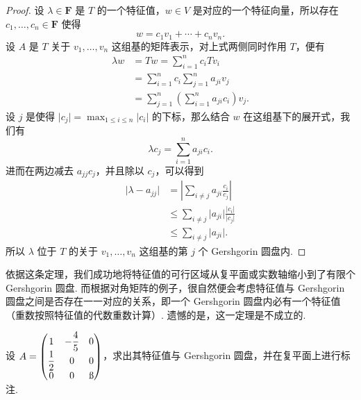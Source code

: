 \begin{proof}
    设 $\lambda \in \mathbf{F}$ 是 $T$ 的一个特征值，$w \in V$ 是对应的一个特征向量，所以存在 $c_1,\ldots, c_n \in \mathbf{F}$ 使得
    \[
        w = c_1 v_1 + \cdots + c_n v_n.
    \]
    设 $A$ 是 $T$ 关于 $v_1, \ldots, v_n$ 这组基的矩阵表示，对上式两侧同时作用 $T$，便有
    \begin{align*}
        \lambda w & = Tw = \sum_{i = 1}^n c_i T v_i                                \\
                  & = \sum_{i = 1}^n c_i \sum_{j = 1}^n a_{ji} v_j                 \\
                  & = \sum_{j = 1}^n \left( \sum_{i = 1}^n a_{ji} c_i \right) v_j.
    \end{align*}
    设 $j$ 是使得 $\lvert c_j \rvert = \max_{1 \leqslant i \leqslant n} \lvert c_i \rvert$ 的下标，那么结合 $w$ 在这组基下的展开式，我们有
    \[
        \lambda c_j = \sum_{i = 1}^n a_{ji} c_i.
    \]
    进而在两边减去 $a_{jj} c_j$，并且除以 $c_j$，可以得到
    \begin{align*}
        \lvert \lambda - a_{jj} \rvert & = \left\lvert \sum_{i \neq j} a_{ji} \frac{c_i}{c_j} \right\rvert                          \\
                                       & \leqslant \sum_{i \neq j} \lvert a_{ji} \rvert \frac{\lvert c_i \rvert}{\lvert c_j \rvert} \\
                                       & \leqslant \sum_{i \neq j} \lvert a_{ji} \rvert.
    \end{align*}
    所以 $\lambda$ 位于 $T$ 的关于 $v_1, \ldots, v_n$ 这组基的第 $j$ 个 Gershgorin 圆盘内.
\end{proof}

依据这条定理，我们成功地将特征值的可行区域从复平面或实数轴缩小到了有限个 Gershgorin 圆盘. 而根据对角矩阵的例子，很自然便会考虑特征值与 Gershgorin 圆盘之间是否存在一一对应的关系，即一个 Gershgorin 圆盘内必有一个特征值（重数按照特征值的代数重数计算）. 遗憾的是，这一定理是不成立的.

\begin{example}{}{}
    设 $A = \begin{pmatrix}
            1           & -\dfrac{4}{5} & 0  \\
            \dfrac{1}{2} & 0            & 0  \\
            0           & 0            & \i
        \end{pmatrix}$，求出其特征值与 Gershgorin 圆盘，并在复平面上进行标注.
\end{example}

